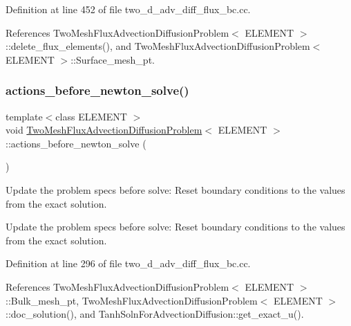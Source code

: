 Definition at line 452 of file two\+\_\+d\+\_\+adv\+\_\+diff\+\_\+flux\+\_\+bc.\+cc.



References Two\+Mesh\+Flux\+Advection\+Diffusion\+Problem$<$ E\+L\+E\+M\+E\+N\+T $>$\+::delete\+\_\+flux\+\_\+elements(), and Two\+Mesh\+Flux\+Advection\+Diffusion\+Problem$<$ E\+L\+E\+M\+E\+N\+T $>$\+::\+Surface\+\_\+mesh\+\_\+pt.

\mbox{\label{classTwoMeshFluxAdvectionDiffusionProblem_a05c049ca4714c5f4866d70f8bbe0f134}} 
\subsubsection{\texorpdfstring{actions\+\_\+before\+\_\+newton\+\_\+solve()}{actions\_before\_newton\_solve()}}
{\footnotesize\ttfamily template$<$class E\+L\+E\+M\+E\+NT $>$ \\
void \hyperlink{classTwoMeshFluxAdvectionDiffusionProblem}{Two\+Mesh\+Flux\+Advection\+Diffusion\+Problem}$<$ E\+L\+E\+M\+E\+NT $>$\+::actions\+\_\+before\+\_\+newton\+\_\+solve (\begin{DoxyParamCaption}{ }\end{DoxyParamCaption})\hspace{0.3cm}{\ttfamily [private]}}



Update the problem specs before solve\+: Reset boundary conditions to the values from the exact solution. 

Update the problem specs before solve\+: Reset boundary conditions to the values from the exact solution. 

Definition at line 296 of file two\+\_\+d\+\_\+adv\+\_\+diff\+\_\+flux\+\_\+bc.\+cc.



References Two\+Mesh\+Flux\+Advection\+Diffusion\+Problem$<$ E\+L\+E\+M\+E\+N\+T $>$\+::\+Bulk\+\_\+mesh\+\_\+pt, Two\+Mesh\+Flux\+Advection\+Diffusion\+Problem$<$ E\+L\+E\+M\+E\+N\+T $>$\+::doc\+\_\+solution(), and Tanh\+Soln\+For\+Advection\+Diffusion\+::get\+\_\+exact\+\_\+u().

